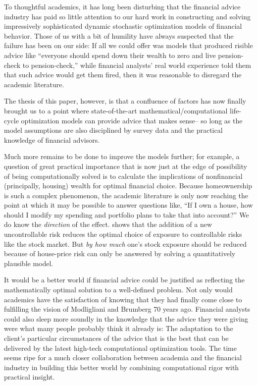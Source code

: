\documentclass{article}
\begin{document}
To thoughtful academics, it has long been disturbing that the financial advice industry has paid so little attention to our hard work in constructing and solving impressively sophisticated dynamic stochastic optimization models of financial behavior.
Those of us with a bit of humility have always suspected that the failure has been on our side: If all we could offer was models that produced risible advice like ``everyone should spend down their wealth to zero and live pension-check to pension-check,'' while financial analysts' real world experience told them that such advice would get them fired, then it was reasonable to disregard the academic literature.

The thesis of this paper, however, is that a confluence of factors has now finally brought us to a point where state-of-the-art mathematical/computational life-cycle optimization models can provide advice that makes sense-- so long as the model assumptions are also disciplined by survey data and the practical knowledge of financial advisors.

Much more remains to be done to improve the models further; for example, a question of great practical importance that is now just at the edge of possibility of being computationally solved is to calculate the implications of nonfinancial (principally, housing) wealth for optimal financial choice.
Because homeownership is such a complex phenomenon, the academic literature is only now reaching the point at which it may be possible to answer questions like, ``If I own a house, how should I modify my spending and portfolio plans to take that into account?''
We do know the \textit{direction} of the effect.
\cite{kimballStandardRA} shows that the addition of a new uncontrollable risk reduces the optimal choice of exposure to controllable risks like the stock market.
But \textit{by how much} one's stock exposure should be reduced because of house-price risk can only be answered by solving a quantitatively plausible model.

It would be a better world if financial advice could be justified as reflecting the mathematically optimal solution to a well-defined problem.
Not only would academics have the satisfaction of knowing that they had finally come close to fulfilling the vision of Modligliani and Brumberg 70 years ago.
Financial analysts could also sleep more soundly in the knowledge that the advice they were giving were what many people probably think it already is: The adaptation to the client's particular circumstances of the advice that is the best that can be delivered by the latest high-tech computational optimization tools.
The time seems ripe for a much closer collaboration between academia and the financial industry in building this better world by combining computational rigor with practical insight.





\end{document}
